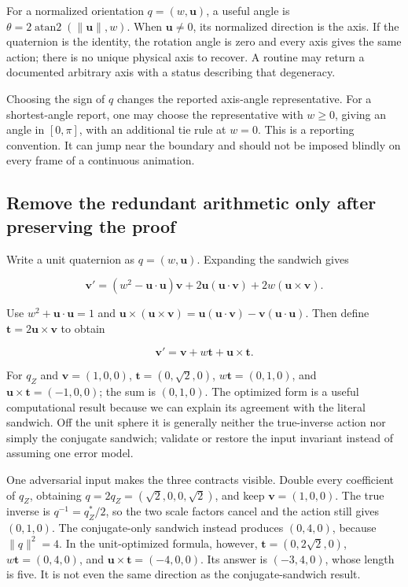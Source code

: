 For a normalized orientation \(q=(w,\mathbf u)\), a useful angle is \(\theta=2\operatorname{atan2}(\|\mathbf u\|,w)\). When \(\mathbf u\ne0\), its normalized direction is the axis. If the quaternion is the identity, the rotation angle is zero and every axis gives the same action; there is no unique physical axis to recover. A routine may return a documented arbitrary axis with a status describing that degeneracy.

Choosing the sign of \(q\) changes the reported axis-angle representative. For a shortest-angle report, one may choose the representative with \(w\ge0\), giving an angle in \([0,\pi]\), with an additional tie rule at \(w=0\). This is a reporting convention. It can jump near the boundary and should not be imposed blindly on every frame of a continuous animation.

\subsection{Remove the redundant arithmetic only after preserving the proof}\label{01-foundations-i-ch019-remove-the-redundant-arithmetic-only-after-preserving-the-proof}

Write a unit quaternion as \(q=(w,\mathbf u)\). Expanding the sandwich gives

\[
\mathbf v'=(w^2-\mathbf u\cdot\mathbf u)\mathbf v
+2\mathbf u(\mathbf u\cdot\mathbf v)
+2w(\mathbf u\times\mathbf v).
\]

Use \(w^2+\mathbf u\cdot\mathbf u=1\) and \(\mathbf u\times(\mathbf u\times\mathbf v)=\mathbf u(\mathbf u\cdot\mathbf v)-\mathbf v(\mathbf u\cdot\mathbf u)\). Then define \(\mathbf t=2\mathbf u\times\mathbf v\) to obtain

\[
\mathbf v'=\mathbf v+w\mathbf t+\mathbf u\times\mathbf t.
\]

For \(q_Z\) and \(\mathbf v=(1,0,0)\), \(\mathbf t=(0,\sqrt2,0)\), \(w\mathbf t=(0,1,0)\), and \(\mathbf u\times\mathbf t=(-1,0,0)\); the sum is \((0,1,0)\). The optimized form is a useful computational result because we can explain its agreement with the literal sandwich. Off the unit sphere it is generally neither the true-inverse action nor simply the conjugate sandwich; validate or restore the input invariant instead of assuming one error model.

One adversarial input makes the three contracts visible. Double every coefficient of \(q_Z\), obtaining \(q=2q_Z=(\sqrt2,0,0,\sqrt2)\), and keep \(\mathbf v=(1,0,0)\). The true inverse is \(q^{-1}=q_Z^*/2\), so the two scale factors cancel and the action still gives \((0,1,0)\). The conjugate-only sandwich instead produces \((0,4,0)\), because \(\|q\|^2=4\). In the unit-optimized formula, however, \(\mathbf t=(0,2\sqrt2,0)\), \(w\mathbf t=(0,4,0)\), and \(\mathbf u\times\mathbf t=(-4,0,0)\). Its answer is \((-3,4,0)\), whose length is five. It is not even the same direction as the conjugate-sandwich result.

